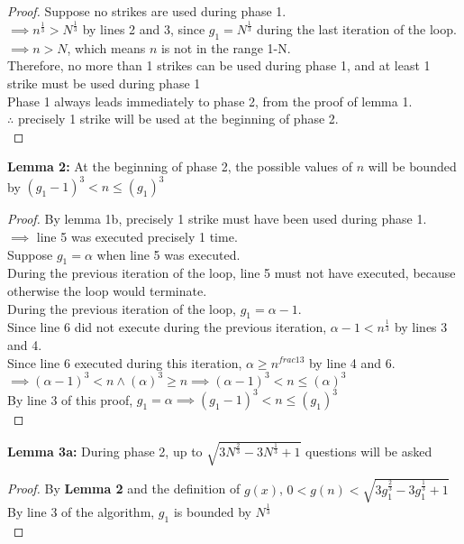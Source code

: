 \begin{problem}
\begin{proof}
    Suppose no strikes are used during phase 1. \\
    $\implies n^{\frac{1}{3}} > N^{\frac{1}{3}}$ by lines 2 and 3, since $g_1 = N^{\frac{1}{3}}$ during the last iteration of the loop. \\
    $\implies n > N$, which means $n$ is not in the range 1-N. \\
    Therefore, no more than 1 strikes can be used during phase 1, and at least 1 strike must be used during phase 1 \\
    Phase 1 always leads immediately to phase 2, from the proof of lemma 1. \\
    $\therefore $ precisely 1 strike will be used at the beginning of phase 2. \\
  \end{proof}
  \textbf{Lemma 2:} At the beginning of phase 2, the possible values of $n$ will be bounded by $(g_1 - 1)^3 < n \leq (g_1)^3$ \\
  \begin{proof}
    By lemma 1b, precisely 1 strike must have been used during phase 1. \\
    $\implies $ line 5 was executed precisely 1 time. \\
    Suppose $g_1 = \alpha$ when line 5 was executed. \\
    During the previous iteration of the loop, line 5 must not have executed, because otherwise the loop would terminate. \\
    During the previous iteration of the loop, $g_1 = \alpha - 1$. \\
    Since line 6 did not execute during the previous iteration, $\alpha - 1 < n^{\frac{1}{3}}$ by lines 3 and 4. \\
    Since line 6 executed during this iteration, $\alpha \geq n^{frac{1}{3}}$ by line 4 and 6. \\
    $\implies (\alpha - 1)^3 < n \land (\alpha)^3 \geq n \implies (\alpha - 1)^3 < n \leq (\alpha)^3$ \\
    By line 3 of this proof, $g_1 = \alpha \implies (g_1 - 1)^3 < n \leq (g_1)^3$ \\
  \end{proof}
  \textbf{Lemma 3a:} During phase 2, up to $\sqrt{3N^{\frac{2}{3}} - 3N^{\frac{1}{3}} + 1}$ questions will be asked
  \begin{proof}
    By \textbf{Lemma 2} and the definition of $g(x)$, $ 0 < g(n) < \sqrt{3g_1^{\frac{2}{3}} - 3g_1^{\frac{1}{3}} + 1}$ \\
    By line 3 of the algorithm, $g_1$ is bounded by $N^{\frac{1}{3}}$ \\

\end{proof}
\end{problem}
